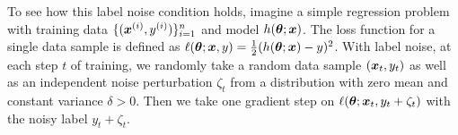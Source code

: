 
To see how this label noise condition holds, imagine a simple regression problem with training data $\{({\bm{x}}^{(i)}, y^{(i)})\}_{i=1}^{n}$ and model $h({\bm{\theta}}; {\bm{x}})$. The loss function for a single data sample is defined as $\ell({\bm{\theta}}; {\bm{x}}, y) = \frac{1}{2}(h({\bm{\theta}}; {\bm{x}}) - y)^2$. With label noise, at each step $t$ of training, we randomly take a random data sample $({\bm{x}}_t, y_t)$ as well as an independent noise perturbation $\zeta_t$ from a distribution with zero mean and constant variance $\delta >0$. Then we take one gradient step on $\ell({\bm{\theta}}; {\bm{x}}_t, y_t + \zeta_t)$ with the noisy label $y_t + \zeta_t$.

